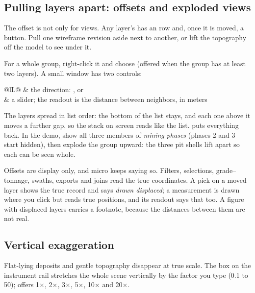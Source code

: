 \subsection{Pulling layers apart: offsets and exploded views}\label{sec:sections-explode}
The offset is not only for views. Any layer's  has an  row and, once it is moved, a  button. Pull one wireframe revision aside next to another, or lift the topography off the model to see under it.

For a whole group, right-click it and choose  (offered when the group has at least two layers). A small window has two controls:

\begin{center}
\begin{tabularx}{\linewidth}{@{}lL@{}}\toprule
{} & the direction: ,  or  \\
 & a slider; the readout is the distance between neighbors, in meters \\ \bottomrule
\end{tabularx}
\end{center}

The layers spread in list order: the bottom of the list stays, and each one above it moves a further gap, so the stack on screen reads like the list.  puts everything back. In the demo, show all three members of \emph{mining phases} (phases 2 and 3 start hidden), then explode the group upward: the three pit shells lift apart so each can be seen whole.

\begin{caution}
Offsets are display only, and micro keeps saying so. Filters, selections, grade–tonnage, swaths, exports and joins read the true coordinates. A pick on a moved layer shows the true record and says \emph{drawn displaced}; a measurement is drawn where you click but reads true positions, and its readout says that too. A figure with displaced layers carries a footnote, because the distances between them are not real.
\end{caution}

\subsection{Vertical exaggeration}\label{sec:sections-zexag}
Flat-lying deposits and gentle topography disappear at true scale. The  box on the instrument rail stretches the whole scene vertically by the factor you type (0.1 to 50);  offers 1×, 2×, 3×, 5×, 10× and 20×.

